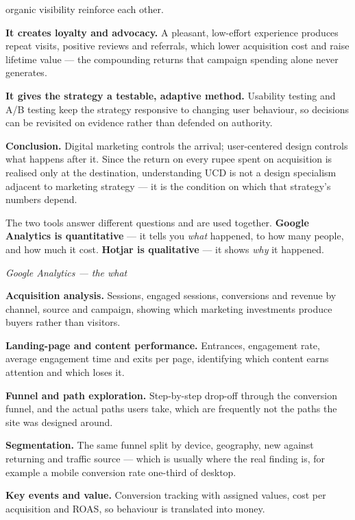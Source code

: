 \begin{qlist}
\begin{apts}
      organic visibility reinforce each other.
\item \textbf{It creates loyalty and advocacy.} A pleasant, low-effort
      experience produces repeat visits, positive reviews and referrals, which
      lower acquisition cost and raise lifetime value --- the compounding
      returns that campaign spending alone never generates.
\item \textbf{It gives the strategy a testable, adaptive method.} Usability
      testing and A/B testing keep the strategy responsive to changing user
      behaviour, so decisions can be revisited on evidence rather than defended
      on authority.
\end{apts}

\textbf{Conclusion.} Digital marketing controls the arrival; user-centered
design controls what happens after it. Since the return on every rupee spent on
acquisition is realised only at the destination, understanding UCD is not a
design specialism adjacent to marketing strategy --- it is the condition on
which that strategy's numbers depend.

The two tools answer different questions and are used together. \textbf{Google
Analytics is quantitative} --- it tells you \emph{what} happened, to how many
people, and how much it cost. \textbf{Hotjar is qualitative} --- it shows
\emph{why} it happened.

\textit{Google Analytics --- the what}
\begin{apts}
\item \textbf{Acquisition analysis.} Sessions, engaged sessions, conversions
      and revenue by channel, source and campaign, showing which marketing
      investments produce buyers rather than visitors.
\item \textbf{Landing-page and content performance.} Entrances, engagement
      rate, average engagement time and exits per page, identifying which
      content earns attention and which loses it.
\item \textbf{Funnel and path exploration.} Step-by-step drop-off through the
      conversion funnel, and the actual paths users take, which are frequently
      not the paths the site was designed around.
\item \textbf{Segmentation.} The same funnel split by device, geography, new
      against returning and traffic source --- which is usually where the real
      finding is, for example a mobile conversion rate one-third of desktop.
\item \textbf{Key events and value.} Conversion tracking with assigned values,
      cost per acquisition and ROAS, so behaviour is translated into money.
\end{apts}


\end{qlist}
